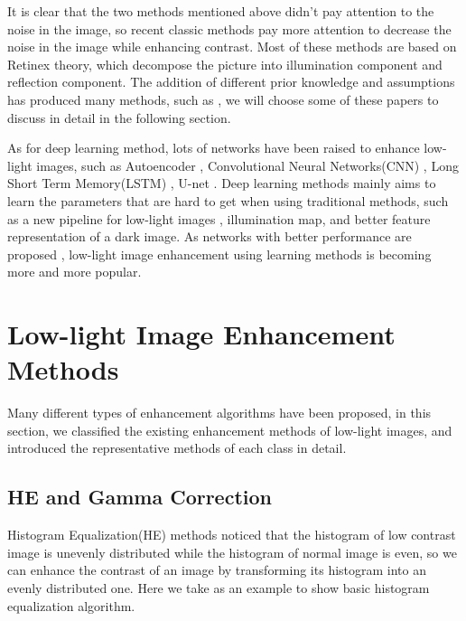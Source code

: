 \documentclass[10pt,twocolumn,letterpaper]{article}
\begin{document}
It is clear that the two methods mentioned above didn't pay attention to the noise in the image, so recent classic methods pay more attention to decrease the noise in the image while enhancing contrast. Most of these methods are based on Retinex theory\cite{land1977retinex}, which decompose the  picture into illumination component and reflection component. The addition of different prior knowledge and assumptions has produced many methods, such as \cite{LiStructure,Wei2018Deep,Xu2019STAR,kurihara2019low,wang2018gladnet}, we will choose some of these papers to discuss in detail in the following section.

As for deep learning method, lots of networks have been raised to enhance low-light images, such as Autoencoder \cite{park2018dual,wang2019image,ren2019low,lore2017llnet}, Convolutional Neural Networks(CNN) \cite{chen2018learning,tong2017convolutional,borglund2019spatio,malik2019llrnet}, Long Short Term Memory(LSTM) \cite{xiang2019effective}, U-net \cite{krishnan2019image}. Deep learning methods mainly aims to learn the parameters that are hard to get when using traditional methods, such as a new pipeline for low-light images \cite{chen2018learning}, illumination map, and better feature representation of a dark image. As networks with better performance are proposed , low-light image enhancement using learning methods is becoming more and more popular.
\section{Low-light Image Enhancement Methods}
Many different types of enhancement algorithms have been proposed, in this section, we classified the existing enhancement methods of low-light images, and introduced the representative methods of each class in detail. 
\subsection{HE and Gamma Correction}
Histogram Equalization(HE) methods noticed that the histogram of low contrast image is unevenly distributed while the histogram of normal image is even, so we can enhance the contrast of an image by transforming its histogram into an evenly distributed one. Here we take\cite{kim1997contrast} as an example to show basic histogram equalization algorithm.
\end{document}
